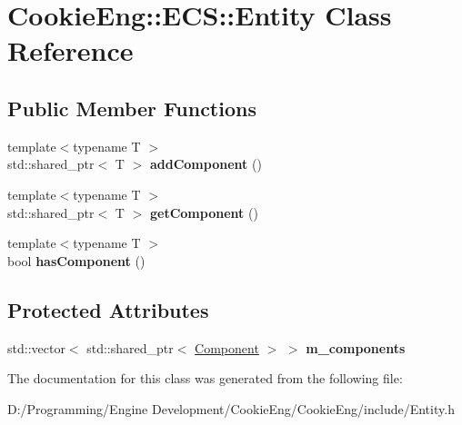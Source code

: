 \hypertarget{class_cookie_eng_1_1_e_c_s_1_1_entity}{}\section{Cookie\+Eng\+:\+:E\+CS\+:\+:Entity Class Reference}
\label{class_cookie_eng_1_1_e_c_s_1_1_entity}
\subsection*{Public Member Functions}
\begin{DoxyCompactItemize}
\item 
\mbox{\label{class_cookie_eng_1_1_e_c_s_1_1_entity_a7b24f6959d8f1686e02e8ae5ef61f08c}} 
{\footnotesize template$<$typename T $>$ }\\std\+::shared\+\_\+ptr$<$ T $>$ {\bfseries add\+Component} ()
\item 
\mbox{\label{class_cookie_eng_1_1_e_c_s_1_1_entity_a7e954d74445ccffe29412c885d97bf63}} 
{\footnotesize template$<$typename T $>$ }\\std\+::shared\+\_\+ptr$<$ T $>$ {\bfseries get\+Component} ()
\item 
\mbox{\label{class_cookie_eng_1_1_e_c_s_1_1_entity_a594daff6ddf321ac9c3a2fad3e50620e}} 
{\footnotesize template$<$typename T $>$ }\\bool {\bfseries has\+Component} ()
\end{DoxyCompactItemize}
\subsection*{Protected Attributes}
\begin{DoxyCompactItemize}
\item 
\mbox{\label{class_cookie_eng_1_1_e_c_s_1_1_entity_a5c8b8b6f07c07b97e898ece5dab38517}} 
std\+::vector$<$ std\+::shared\+\_\+ptr$<$ \hyperlink{class_cookie_eng_1_1_e_c_s_1_1_component}{Component} $>$ $>$ {\bfseries m\+\_\+components}
\end{DoxyCompactItemize}


The documentation for this class was generated from the following file\+:\begin{DoxyCompactItemize}
\item 
D\+:/\+Programming/\+Engine Development/\+Cookie\+Eng/\+Cookie\+Eng/include/Entity.\+h\end{DoxyCompactItemize}
